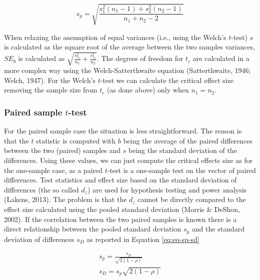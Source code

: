 \documentclass[
  man,floatsintext]{apa7}
\begin{document}
\begin{equation}
    \label{eq:eq-s-p-twsmp}
    s_p = \sqrt{\frac{s_1^2 (n_1 - 1) + s_2^2 (n_2 - 1)}{n_1 + n_2 - 2}}
\end{equation}

When relaxing the assumption of equal variances (i.e., using the Welch's \(t\)-test) \(s\) is calculated as the square root of the average between the two samples variances, \(SE_b\) is calculated as \(\sqrt{\frac{s^2_{x_1}}{n_1} + \frac{s^2_{x_2}}{n_2}}\). The degrees of freedom for \(t_c\) are calculated in a more complex way using the Welch-Satterthwaite equation (Satterthwaite, 1946; Welch, 1947). For the Welch's \(t\)-test we can calculate the critical effect size removing the sample size from \(t_c\) (as done above) only when \(n_1 = n_2\).

\hypertarget{paired-sample-t-test}{%
\subsubsection{\texorpdfstring{Paired sample \(t\)-test}{Paired sample t-test}}\label{paired-sample-t-test}}

For the paired sample case the situation is less straightforward. The reason is that the \(t\) statistic is computed with \(b\) being the average of the paired differences between the two (paired) samples and \(s\) being the standard deviation of the differences. Using these values, we can just compute the critical effects size as for the one-sample case, as a paired \(t\)-test is a one-sample test on the vector of paired differences. Test statistics and effect size based on the standard deviation of differences (the so called \(d_z\)) are used for hypothesis testing and power analysis (Lakens, 2013). The problem is that the \(d_z\) cannot be directly compared to the effect size calculated using the pooled standard deviation (Morris \& DeShon, 2002). If the correlation between the two paired samples is known there is a direct relationship between the pooled standard deviation \(s_p\) and the standard deviation of differences \(s_D\) as reported in Equation \eqref{eq:eq-sp-sd}

\begin{equation}
    \label{eq:eq-sp-sd}
    \begin{gathered}
        s_p =  \frac{s_D}{\sqrt{2(1 - \rho)}} \\
        s_D =  s_p \sqrt{2(1 - \rho)}
    \end{gathered}
\end{equation}
\end{document}
